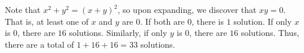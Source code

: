Note that $x^2+y^2=\left(x+y\right)^2$, so upon expanding, we discover that $xy=0$. That is, at least one of $x$ and $y$ are $0$. If both are $0$, there is $1$ solution. If only $x$ is $0$, there are $16$ solutions. Similarly, if only $y$ is $0$, there are $16$ solutions. Thus, there are a total of $1+16+16=\boxed{33}$ solutions.